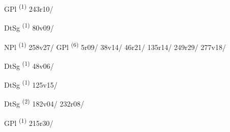 \noindent{} \LEMMALINE
\begin{description}
    \item[] GPl \textsuperscript{(1)} \mbox{243r10/}
\end{description}
\ENTRYEND

\noindent{} \LEMMALINE
\begin{description}
    \item[] DtSg \textsuperscript{(1)} \mbox{80v09/}
\end{description}
\ENTRYEND

\noindent{} \LEMMALINE
\begin{description}
    \item[] NPl \textsuperscript{(1)} \mbox{258v27/} \CASEBREAK GPl \textsuperscript{(6)} \mbox{5r09/} \mbox{38v14/} \mbox{46r21/} \mbox{135r14/} \mbox{249r29/} \mbox{277v18/}
\end{description}
\ENTRYEND

\noindent{} \LEMMALINE
\begin{description}
    \item[] DtSg \textsuperscript{(1)} \mbox{48v06/}
\end{description}
\ENTRYEND

\noindent{} \LEMMALINE
\begin{description}
    \item[] DtSg \textsuperscript{(1)} \mbox{125v15/}
\end{description}
\ENTRYEND

\noindent{} \LEMMALINE
\begin{description}
    \item[] DtSg \textsuperscript{(2)} \mbox{182v04/} \mbox{232r08/}
\end{description}
\ENTRYEND

\noindent{} \LEMMALINE
\begin{description}
    \item[] GPl \textsuperscript{(1)} \mbox{215r30/}
\end{description}
\ENTRYEND

